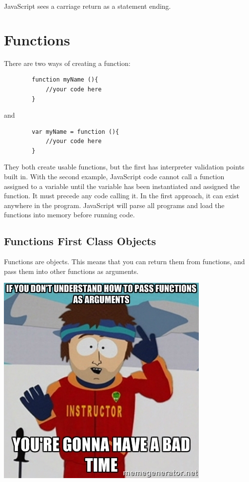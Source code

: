 \documentclass {amsart}
\begin{document}
		JavaScript sees a carriage return as a statement ending.

\section {Functions}
	There are two ways of creating a function:

	\begin{lstlisting}
		function myName (){
			//your code here
		}
	\end{lstlisting}

	and 

	\begin{lstlisting}
		var myName = function (){
			//your code here
		}
	\end{lstlisting}

	They both create usable functions, but the first has interpreter validation points built in.  With the second example, JavaScript code cannot call a function assigned to a variable until the variable has been instantiated and assigned the function.  
It must precede any code calling it.  In the first approach, it can exist anywhere in the program.  JavaScript will parse all programs and load the functions into memory before running code.  

	\subsection{Functions First Class Objects}  Functions are objects.  This means that you can return them from functions, and pass them into other functions as arguments.

		\includegraphics{FunctionAsArgumentsBadTime.jpg}
\end{document}
